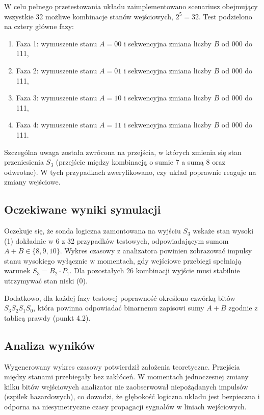 \documentclass[11pt]{article}
\begin{document}
W celu pełnego przetestowania układu zaimplementowano scenariusz obejmujący wszystkie 32 możliwe kombinacje stanów wejściowych, \(2^5 = 32\). Test podzielono na cztery główne fazy:
\begin{enumerate}
    \item Faza 1: wymuszenie stanu \(A = 00\) i sekwencyjna zmiana liczby \(B\) od 000 do 111,
    \item Faza 2: wymuszenie stanu \(A = 01\) i sekwencyjna zmiana liczby \(B\) od 000 do 111,
    \item Faza 3: wymuszenie stanu \(A = 10\) i sekwencyjna zmiana liczby \(B\) od 000 do 111,
    \item Faza 4: wymuszenie stanu \(A = 11\) i sekwencyjna zmiana liczby \(B\) od 000 do 111.
\end{enumerate}

Szczególna uwaga została zwrócona na przejścia, w których zmienia się stan przeniesienia \(S_3\) (przejście między kombinacją o sumie 7 a sumą 8 oraz odwrotne). W tych przypadkach zweryfikowano, czy układ poprawnie reaguje na zmiany wejściowe.

\subsection{Oczekiwane wyniki symulacji}

Oczekuje się, że sonda logiczna zamontowana na wyjściu \(S_3\) wskaże stan wysoki (1) dokładnie w 6 z 32 przypadków testowych, odpowiadającym sumom \(A + B \in \{8, 9, 10\}\). Wykres czasowy z analizatora powinien zobrazować impulsy stanu wysokiego wyłącznie w momentach, gdy wejściowe przebiegi spełniają warunek \(S_3 = B_2 \cdot P_1\). Dla pozostałych 26 kombinacji wyjście musi stabilnie utrzymywać stan niski (0).

Dodatkowo, dla każdej fazy testowej poprawność określono czwórką bitów \(S_3S_2S_1S_0\), która powinna odpowiadać binarnemu zapisowi sumy \(A + B\) zgodnie z tablicą prawdy (punkt 4.2).

\subsection{Analiza wyników}

Wygenerowany wykres czasowy potwierdził założenia teoretyczne. Przejścia między stanami przebiegały bez zakłóceń. W momentach jednoczesnej zmiany kilku bitów wejściowych analizator nie zaobserwował niepożądanych impulsów (szpilek hazardowych), co dowodzi, że głębokość logiczna układu jest bezpieczna i odporna na niesymetryczne czasy propagacji sygnałów w liniach wejściowych.
\end{document}
